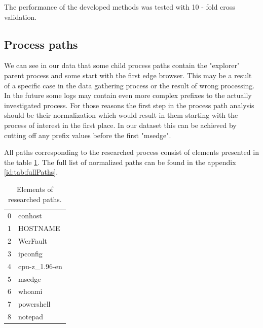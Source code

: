 \documentclass[a4paper,twoside,12pt]{book}
\begin{document}
The performance of the developed methods was tested with 10 - fold cross validation. 

\subsection{Process paths}

We can see in our data that some child process paths contain the "explorer" parent process and some start with the first 
edge browser. This may be a result of a specific case in the data gathering process or the result of wrong 
processing. In the future some logs may contain even more complex prefixes to the actually investigated
process. For those reasons the first step in the process path analysis should be their normalization which
would result in them starting with the process of interest in the first place. In our dataset this can 
be achieved by cutting off any prefix values before the first "msedge".  

All paths corresponding to the researched process consist of elements presented in the table 
\ref{id:tab:pathElems}. The full list of normalized paths can be found in the appendix \ref{id:tab:fullPaths}.

\begin{table}
\centering
\caption{Elements of researched paths.}
\label{id:tab:pathElems}
\begin{tabular}{ll}
	\toprule
	0 &        conhost \\
	1 &       HOSTNAME \\
	2 &       WerFault \\
	3 &       ipconfig \\
	4 &  cpu-z\_1.96-en \\
	5 &         msedge \\
	6 &         whoami \\
	7 &     powershell \\
	8 &        notepad \\
	\bottomrule
\end{tabular}
\end{table}		
	
\end{document}
